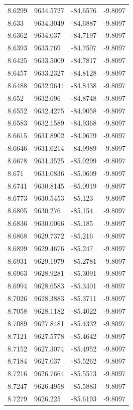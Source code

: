 \begin{table}[H]
\begin{tabular}{llll}
8.6299 & 9634.5727 & -84.6576 & -9.8097 \\
8.633 & 9634.3049 & -84.6887 & -9.8097 \\
8.6362 & 9634.037 & -84.7197 & -9.8097 \\
8.6393 & 9633.769 & -84.7507 & -9.8097 \\
8.6425 & 9633.5009 & -84.7817 & -9.8097 \\
8.6457 & 9633.2327 & -84.8128 & -9.8097 \\
8.6488 & 9632.9644 & -84.8438 & -9.8097 \\
8.652 & 9632.696 & -84.8748 & -9.8097 \\
8.6552 & 9632.4275 & -84.9058 & -9.8097 \\
8.6583 & 9632.1589 & -84.9368 & -9.8097 \\
8.6615 & 9631.8902 & -84.9679 & -9.8097 \\
8.6646 & 9631.6214 & -84.9989 & -9.8097 \\
8.6678 & 9631.3525 & -85.0299 & -9.8097 \\
8.671 & 9631.0836 & -85.0609 & -9.8097 \\
8.6741 & 9630.8145 & -85.0919 & -9.8097 \\
8.6773 & 9630.5453 & -85.123 & -9.8097 \\
8.6805 & 9630.276 & -85.154 & -9.8097 \\
8.6836 & 9630.0066 & -85.185 & -9.8097 \\
8.6868 & 9629.7372 & -85.216 & -9.8097 \\
8.6899 & 9629.4676 & -85.247 & -9.8097 \\
8.6931 & 9629.1979 & -85.2781 & -9.8097 \\
8.6963 & 9628.9281 & -85.3091 & -9.8097 \\
8.6994 & 9628.6583 & -85.3401 & -9.8097 \\
8.7026 & 9628.3883 & -85.3711 & -9.8097 \\
8.7058 & 9628.1182 & -85.4022 & -9.8097 \\
8.7089 & 9627.8481 & -85.4332 & -9.8097 \\
8.7121 & 9627.5778 & -85.4642 & -9.8097 \\
8.7152 & 9627.3074 & -85.4952 & -9.8097 \\
8.7184 & 9627.037 & -85.5262 & -9.8097 \\
8.7216 & 9626.7664 & -85.5573 & -9.8097 \\
8.7247 & 9626.4958 & -85.5883 & -9.8097 \\
8.7279 & 9626.225 & -85.6193 & -9.8097 \\

\end{tabular}
\end{table}
